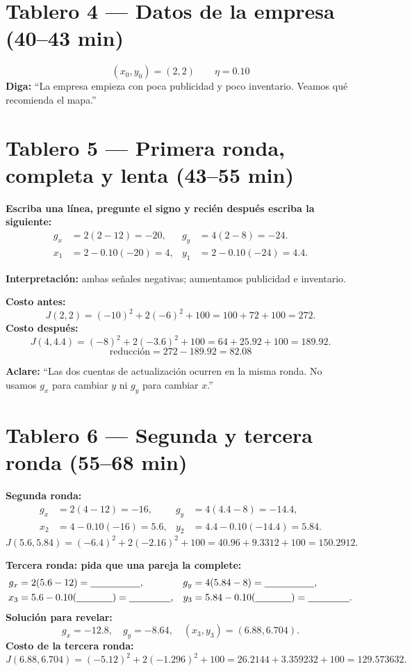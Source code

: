 \documentclass[11pt]{article}
\begin{document}
\section*{Tablero 4 --- Datos de la empresa (40--43 min)}
\[
\boxed{(x_0,y_0)=(2,2)}\qquad\boxed{\eta=0.10}
\]
\textbf{Diga:} ``La empresa empieza con poca publicidad y poco inventario. Veamos
qué recomienda el mapa.''

\newpage
\section*{Tablero 5 --- Primera ronda, completa y lenta (43--55 min)}
\textbf{Escriba una línea, pregunte el signo y recién después escriba la siguiente:}
\[
\begin{aligned}
g_x&=2(2-12)=\boxed{-20},&
g_y&=4(2-8)=\boxed{-24}.\\
x_1&=2-0.10(-20)=\boxed{4},&
y_1&=2-0.10(-24)=\boxed{4.4}.
\end{aligned}
\]

\textbf{Interpretación:} ambas señales negativas; aumentamos publicidad e inventario.

\textbf{Costo antes:}
\[
J(2,2)=(-10)^2+2(-6)^2+100=100+72+100=\boxed{272}.
\]
\textbf{Costo después:}
\[
J(4,4.4)=(-8)^2+2(-3.6)^2+100
=64+25.92+100=\boxed{189.92}.
\]
\[
\boxed{\text{reducción}=272-189.92=82.08}
\]

\textbf{Aclare:} ``Las dos cuentas de actualización ocurren en la misma ronda. No
usamos $g_x$ para cambiar $y$ ni $g_y$ para cambiar $x$.''

\newpage
\section*{Tablero 6 --- Segunda y tercera ronda (55--68 min)}
\textbf{Segunda ronda:}
\[
\begin{aligned}
g_x&=2(4-12)=-16,&g_y&=4(4.4-8)=-14.4,\\
x_2&=4-0.10(-16)=\boxed{5.6},&
y_2&=4.4-0.10(-14.4)=\boxed{5.84}.
\end{aligned}
\]
\[
J(5.6,5.84)=(-6.4)^2+2(-2.16)^2+100
=40.96+9.3312+100=\boxed{150.2912}.
\]

\textbf{Tercera ronda: pida que una pareja la complete:}
\[
\begin{aligned}
g_x&=2(5.6-12)=\underline{\hspace{1.8cm}},&
g_y&=4(5.84-8)=\underline{\hspace{1.8cm}},\\
x_3&=5.6-0.10(\underline{\hspace{1.3cm}})=\underline{\hspace{1.5cm}},&
y_3&=5.84-0.10(\underline{\hspace{1.3cm}})=\underline{\hspace{1.5cm}}.
\end{aligned}
\]
\textbf{Solución para revelar:}
\[
g_x=-12.8,\quad g_y=-8.64,\quad
(x_3,y_3)=(\boxed{6.88},\boxed{6.704}).
\]
\textbf{Costo de la tercera ronda:}
\[
J(6.88,6.704)=(-5.12)^2+2(-1.296)^2+100
=26.2144+3.359232+100=\boxed{129.573632}.
\]
\end{document}
